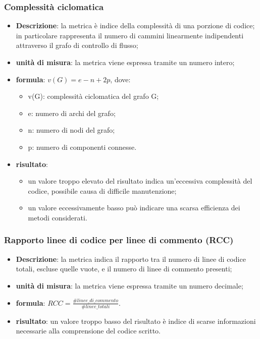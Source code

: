	\subsubsection*{Complessità ciclomatica}
	\begin{itemize}
		\item{\textbf{Descrizione}}: la metrica è indice della complessità di una porzione di codice;  in particolare rappresenta il numero di cammini linearmente indipendenti attraverso il grafo di controllo di flusso;
		\item{\textbf{unità di misura}}: la metrica viene espressa tramite un numero intero;
		\item{\textbf{formula}}: $ v(G) = e - n + 2p $, dove:
			\begin{itemize}
				\item{v(G)}: complessità ciclomatica del grafo G;
				\item{e}: numero di archi del grafo;
				\item{n}: numero di nodi del grafo;
				\item{p}: numero di componenti connesse.
			\end{itemize}
		\item{\textbf{risultato}}:
			\begin{itemize}
				\item un valore troppo elevato del risultato indica un'eccessiva complessità del codice, possibile causa di difficile manutenzione;
				\item un valore eccessivamente basso può indicare una scarsa efficienza dei metodi considerati.
			\end{itemize}
	\end{itemize}

	\subsubsection*{Rapporto linee di codice per linee di commento (RCC)}
	\begin{itemize}
		\item{\textbf{Descrizione}}: la metrica indica il rapporto tra il numero di linee di codice totali, escluse quelle vuote, e il numero di linee di commento presenti;
		\item{\textbf{unità di misura}}: la metrica viene espressa tramite un numero decimale;
		\item{\textbf{formula}}: $ RCC = \displaystyle\frac{\#linee\_di\_commento}{\#linee\_totali} $.
		\item{\textbf{risultato}}: un valore troppo basso del risultato è indice di scarse informazioni necessarie alla comprensione del codice scritto.
	\end{itemize}

